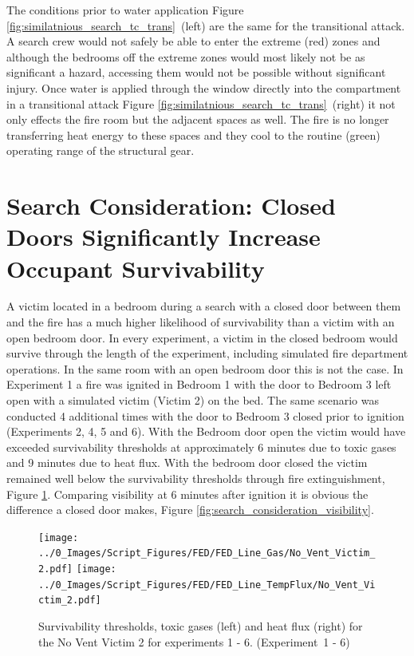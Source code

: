 \documentclass[12pt,oneside]{book}
\begin{document}
The conditions prior to water application Figure \ref{fig:similatnious_search_tc_trans}~(left) are the same for the transitional attack. A search crew would not safely be able to enter the extreme (red) zones and although the bedrooms off the extreme zones would most likely not be as significant a hazard, accessing them would not be possible without significant injury. Once water is applied through the window directly into the compartment in a transitional attack Figure \ref{fig:similatnious_search_tc_trans}~(right) it not only effects the fire room but the adjacent spaces as well. The fire is no longer transferring heat energy to these spaces and they cool to the routine (green) operating range of the structural gear. 

\section{Search Consideration: Closed Doors Significantly Increase Occupant Survivability} \label{tc:Search_Considersation_Closed_Doors}
A victim located in a bedroom during a search with a closed door between them and the fire has a much higher likelihood of survivability than a victim with an open bedroom door.  In every experiment, a victim in the closed bedroom would survive through the length of the experiment, including simulated fire department operations.  In the same room with an open bedroom door this is not the case.  In Experiment 1 a fire was ignited in Bedroom 1 with the door to Bedroom 3 left open with a simulated victim (Victim 2) on the bed.  The same scenario was conducted 4 additional times with the door to Bedroom 3 closed prior to ignition (Experiments 2, 4, 5 and 6).   With the Bedroom door open the victim would have exceeded survivability thresholds at approximately 6 minutes due to toxic gases and 9 minutes due to heat flux.  With the bedroom door closed the victim remained well below the survivability thresholds through fire extinguishment, Figure \ref{fig:search_consideration_survivability}. Comparing visibility at 6 minutes after ignition it is obvious the difference a closed door makes, Figure \ref{fig:search_consideration_visibility}. 

\begin{figure}[H]
\centering
\texttt{[image: ../0\_Images/Script\_Figures/FED/FED\_Line\_Gas/No\_Vent\_Victim\_2.pdf]}
\texttt{[image: ../0\_Images/Script\_Figures/FED/FED\_Line\_TempFlux/No\_Vent\_Victim\_2.pdf]}
\caption[Survivability Thresholds - Toxic Gases - Heat Flux]{Survivability thresholds, toxic gases (left) and heat flux (right) for the No Vent Victim 2 for experiments 1 - 6. (Experiment~1 - 6)}
\label{fig:search_consideration_survivability}
\end{figure}
\end{document}
